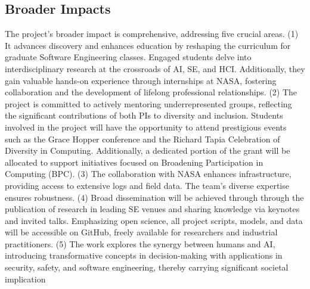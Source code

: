 
\subsection{Broader Impacts}

The project's broader impact is comprehensive, addressing five crucial areas. (1) It advances discovery and enhances education by reshaping the curriculum for graduate Software Engineering classes. Engaged students delve into interdisciplinary research at the crossroads of AI, SE, and HCI. Additionally, they gain valuable hands-on experience through internships at NASA, fostering collaboration and the development of lifelong professional relationships. (2) The project is committed to actively mentoring underrepresented groups, reflecting the significant contributions of both PIs to diversity and inclusion. Students involved in the project will have the opportunity to attend prestigious events such as the Grace Hopper conference and the Richard Tapia Celebration of Diversity in Computing. Additionally, a dedicated portion of the grant will be allocated to support initiatives focused on Broadening Participation in Computing (BPC). (3) The collaboration with NASA enhances infrastructure, providing access to extensive logs and field data. The team's diverse expertise ensures robustness. (4) Broad dissemination will be achieved through  through the publication of research in leading SE venues and sharing knowledge via keynotes and invited talks. Emphasizing open science, all project scripts, models, and data will be accessible on GitHub, freely available for researchers and industrial practitioners. (5) The work explores the synergy between humans and AI, introducing transformative concepts in decision-making with applications in security, safety, and software engineering, thereby carrying significant societal implication

